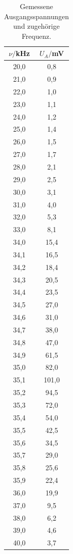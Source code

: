 \begin{table}[H]
  \centering
  \caption{Gemessene Ausgangsspannungen und zugehörige Frequenz.}
  \label{tab:Rechteckspannung}
  \begin{tabular}{c c}
    \toprule
    $\nu/$kHz & $U_A/$mV \\
    \midrule
20,0& 0,8 \\
21,0&	0,9\\
22,0&	1,0\\
23,0&	1,1\\
24,0&	1,2\\
25,0&	1,4\\
26,0&	1,5\\
27,0&	1,7\\
28,0&	2,1\\
29,0&	2,5\\
30,0&	3,1\\
31,0&	4,0\\
32,0&	5,3\\
33,0&	8,1\\
34,0&	15,4\\
34,1&	16,5\\
34,2&	18,4\\
34,3&	20,5\\
34,4&	23,5\\
34,5&	27,0\\
34,6&	31,0\\
34,7&	38,0\\
34,8&	47,0\\
34,9&	61,5\\
35,0&	82,0\\
35,1&	101,0\\
35,2&	94,5\\
35,3&	72,0\\
35,4&	54,0\\
35,5&	42,5\\
35,6&	34,5\\
35,7&	29,0\\
35,8&	25,6\\
35,9&	22,4\\
36,0&	19,9\\
37,0&	9,5\\
38,0&	6,2\\
39,0&	4,6\\
40,0&	3,7\\
      

   \bottomrule
  \end{tabular}
\end{table}

